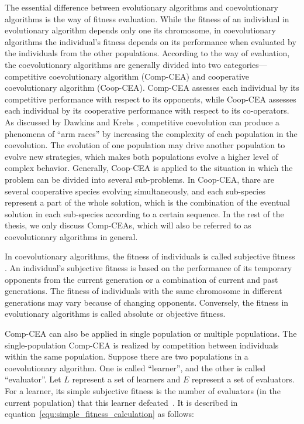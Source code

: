 The essential difference between evolutionary algorithms and coevolutionary algorithms is the way of fitness evaluation. While the fitness of an individual in evolutionary algorithm depends only one its chromosome, in coevolutionary algorithms the individual's fitness depends on its performance when evaluated by the individuals from the other populations. According to the way of evaluation, the coevolutionary algorithms are generally divided into two categories---competitive coevolutionary algorithm (Comp-CEA) and cooperative coevolutionary algorithm (Coop-CEA). Comp-CEA assesses each individual by its competitive performance with respect to its opponents, while Coop-CEA assesses each individual by its cooperative performance with respect to its co-operators. As discussed by Dawkins and Krebs \cite{Dawkins_1979}, competitive coevolution can produce a phenomena of ``arm races'' by increasing the complexity of each population in the coevolution. The evolution of one population may drive another population to evolve new strategies, which makes both populations evolve a higher level of complex behavior. Generally, Coop-CEA is applied to the situation in which the problem can be divided into several sub-problems. In Coop-CEA, thare are several cooperative species evolving simultaneously, and each sub-species represent a part of the whole solution, which is the combination of the eventual solution in each sub-species according to a certain sequence. In the rest of the thesis, we only discuss Comp-CEAs, which will also be referred to as coevolutionary algorithms in general.

In coevolutionary algorithms, the fitness of individuals is called subjective fitness \cite{John_2004}. An individual's subjective fitness is based on the performance of its temporary opponents from the current generation or a combination of current and past generations. The fitness of individuals with the same chromosome in different generations may vary because of changing opponents. Conversely, the fitness in evolutionary algorithms is called absolute or objective fitness.

Comp-CEA can also be applied in single population or multiple populations. The single-population Comp-CEA is realized by competition between individuals within the same population. Suppose there are two populations in a coevolutionary algorithm. One is called ``learner'', and the other is called ``evaluator''. Let $L$ represent a set of learners and $E$ represent a set of evaluators. For a learner, its simple subjective fitness is the number of evaluators (in the current population) that this learner defeated~\cite{Angeline_1993}. It is described in equation~\eqref{equ:simple_fitness_calculation} as follows:


